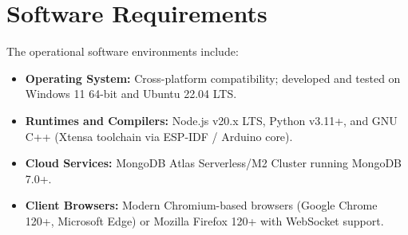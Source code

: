 \section{Software Requirements}
The operational software environments include:
\begin{itemize}
    \item \textbf{Operating System:} Cross-platform compatibility; developed and tested on Windows 11 64-bit and Ubuntu 22.04 LTS.
    \item \textbf{Runtimes and Compilers:} Node.js v20.x LTS, Python v3.11+, and GNU C++ (Xtensa toolchain via ESP-IDF / Arduino core).
    \item \textbf{Cloud Services:} MongoDB Atlas Serverless/M2 Cluster running MongoDB 7.0+.
    \item \textbf{Client Browsers:} Modern Chromium-based browsers (Google Chrome 120+, Microsoft Edge) or Mozilla Firefox 120+ with WebSocket support.
\end{itemize}

